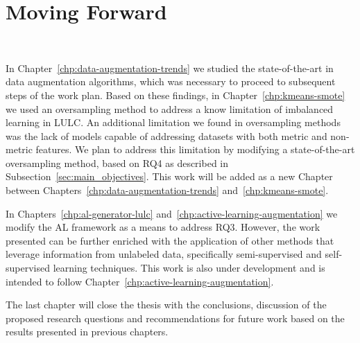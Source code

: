 \chapter{Moving Forward}~\label{chp:moving_forward}

In Chapter~\ref{chp:data-augmentation-trends} we studied the state-of-the-art
in data augmentation algorithms, which was necessary to proceed to subsequent
steps of the work plan. Based on these findings, in
Chapter~\ref{chp:kmeans-smote} we used an oversampling method to address a
know limitation of imbalanced learning in LULC\@. An additional limitation we
found in oversampling methods was the lack of models capable of addressing
datasets with both metric and non-metric features. We plan to address this
limitation by modifying a state-of-the-art oversampling method, based on RQ4
as described in Subsection~\ref{sec:main_objectives}. This work will be added
as a new Chapter between Chapters~\ref{chp:data-augmentation-trends}
and~\ref{chp:kmeans-smote}.

In Chapters~\ref{chp:al-generator-lulc}
and~\ref{chp:active-learning-augmentation} we modify the AL framework as a
means to address RQ3. However, the work presented can be further enriched with
the application of other methods that leverage information from unlabeled
data, specifically semi-supervised and self-supervised learning techniques.
This work is also under development and is intended to follow
Chapter~\ref{chp:active-learning-augmentation}.

The last chapter will close the thesis with the conclusions, discussion of the
proposed research questions and recommendations for future work based on the
results presented in previous chapters.
